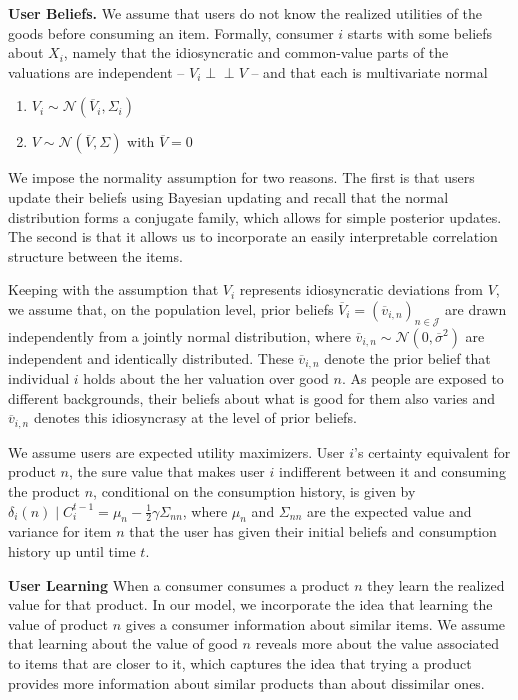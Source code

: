 \documentclass[sigconf]{acmart}
\begin{document}
\par
\noindent \textbf{User Beliefs.} We assume that users do not know the realized utilities of the goods before consuming an item.
Formally, consumer $i$ starts with some beliefs about $X_i$, namely that the idiosyncratic and common-value parts of the valuations are independent -- $V_i \perp \!\!\! \perp V$ -- and that each is multivariate normal 
\begin{enumerate}[topsep=0pt]
\item $V_i \sim \mathcal N (\overline V_i, \Sigma_i)$ 
\item $V \sim \mathcal N(\overline V, \Sigma)$ with $\overline V =0$
\end{enumerate}
We impose the normality assumption for two reasons. The first is that users update their beliefs using Bayesian updating and recall that the normal distribution forms a conjugate family, which allows for simple posterior updates. The second is that it allows us to incorporate an easily interpretable correlation structure between the items.
\par
Keeping with the assumption that $V_i$ represents idiosyncratic deviations from $V$, we assume that, on the population level, prior beliefs $\overline V_i=\left(\overline v_{i,n}\right)_{n \in \mathcal{J}}$ are drawn independently from a jointly normal distribution, where $\overline v_{i,n} \sim \mathcal N (0, \overline \sigma^2)$ are independent and identically distributed. These $\overline v_{i,n}$ denote the prior belief that individual $i$ holds about the her valuation over good $n$. As people are exposed to different backgrounds, their beliefs about what is good for them also varies and $\overline v_{i,n}$ denotes this idiosyncrasy at the level of prior beliefs.
\par

We assume users are expected utility maximizers. User $i$'s certainty equivalent for product $n$, the sure value that makes user $i$ indifferent between it and consuming the product $n$, conditional on the consumption history, is given by
$\delta_{i}(n)\mid C_i^{t-1}=\mu_n-\frac{1}{2}\gamma \Sigma_{nn}$, where $\mu_n$ and $\Sigma_{nn}$ are the expected value and variance for item $n$ that the user has given their initial beliefs and consumption history up until time $t$.

\noindent \textbf{User Learning}
When a consumer consumes a product $n$ they learn the realized value for that product. In our model, we incorporate the idea that learning the value of product $n$ gives a consumer information about similar items. 
We assume that learning about the value of good $n$ reveals more about the value associated to items that are closer to it, which captures the idea that trying a product provides more information about similar products than about dissimilar ones.
\par
\end{document}
